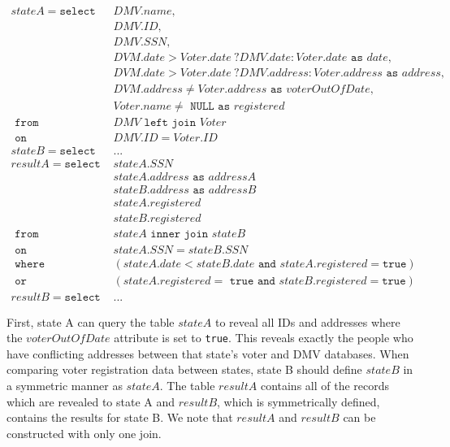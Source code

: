 {
	\scriptsize
	\begin{align*}	
	stateA = \texttt{select }& DMV.name,\\
							 & DMV.ID, \\
							 & DMV.SSN, \\
							 & DVM.date > Voter.date\ ? DMV.date : Voter.date \texttt{ as } date,\\
							 & DVM.date > Voter.date\ ? DMV.address : Voter.address \texttt{ as } address,\\
							 & DVM.address \neq Voter.address \texttt{ as } voterOutOfDate, \\ 
							 & Voter.name \neq \texttt{ NULL as } registered \\
			 \texttt{ from } & DMV \texttt{ left join } Voter \\
			   \texttt{ on } & DMV.ID = Voter.ID \\
			   stateB = \texttt{select }&...\\
	resultA = \texttt{select } & stateA.SSN \\
							   & stateA.address \texttt{ as } addressA\\
							   & stateB.address \texttt{ as } addressB\\
							   & stateA.registered \\
							   & stateB.registered \\
			   \texttt{ from } & stateA \texttt{ inner join } stateB \\
   			     \texttt{ on } & stateA.SSN = stateB.SSN\\
   			  \texttt{ where } & (stateA.date < stateB.date \texttt{ and } stateA.registered = \texttt{true}) \\
     			   \texttt{ or } & (stateA.registered = \texttt{ true and }stateB.registered = \texttt{true})\\
   resultB = \texttt{select } & ...
	\end{align*}
}

First, state A can query the table $stateA$ to reveal all IDs and addresses where the $voterOutOfDate$ attribute is set to \texttt{true}. This reveals exactly the people who have conflicting addresses between that state's voter and DMV databases. When comparing voter registration data between states, state B should define $stateB$ in a symmetric manner as $stateA$. The table $resultA$ contains all of the records which are revealed to state A and $resultB$, which is symmetrically defined, contains the results for state B. We note that $resultA$ and $resultB$ can be constructed with only one join.

